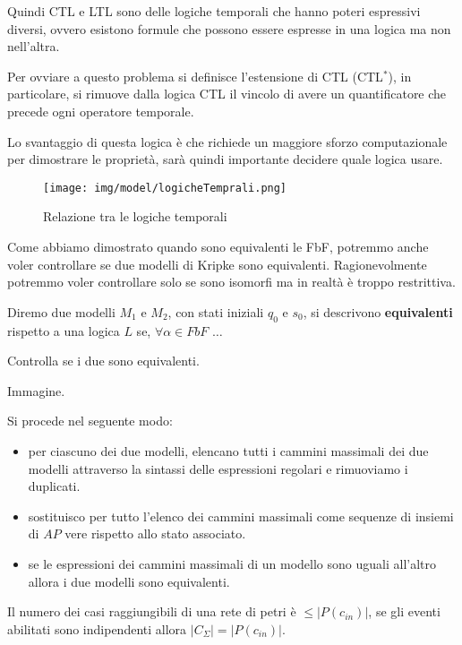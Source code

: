 Quindi CTL e LTL sono delle logiche temporali che hanno poteri espressivi diversi,
ovvero esistono formule che possono essere espresse in una logica ma non nell'altra.

Per ovviare a questo problema si definisce l'estensione di CTL (CTL$^\ast$),
in particolare, si rimuove dalla logica CTL il vincolo di avere un quantificatore
che precede ogni operatore temporale.

Lo svantaggio di questa logica è che richiede un maggiore sforzo computazionale
per dimostrare le proprietà, sarà quindi importante decidere quale logica usare.
\begin{figure}[!ht]
    \centering
    \texttt{[image: img/model/logicheTemprali.png]}
    \caption{Relazione tra le logiche temporali}
\end{figure}

Come abbiamo dimostrato quando sono equivalenti le FbF, potremmo anche voler
controllare se due modelli di Kripke sono equivalenti. Ragionevolmente potremmo
voler controllare solo se sono isomorfi ma in realtà è troppo restrittiva. 

\begin{definizione}
    Diremo due modelli $M_1$ e $M_2$, con stati iniziali $q_0$ e $s_0$, si descrivono
    \textbf{equivalenti} rispetto a una logica $L$ se, $\forall \alpha \in FbF$
    $\dots$ 
\end{definizione}

\begin{esempio}
    Controlla se i due sono equivalenti.
    
    Immagine.

    Si procede nel seguente modo:
    \begin{itemize}
        \item per ciascuno dei due modelli, elencano tutti i cammini massimali dei 
        due modelli attraverso la sintassi delle espressioni regolari e rimuoviamo
        i duplicati.
        \item sostituisco per tutto l'elenco dei cammini massimali come sequenze
        di insiemi di $AP$ vere rispetto allo stato associato. 
        \item se le espressioni dei cammini massimali di un modello sono uguali 
        all'altro allora i due modelli sono equivalenti.
    \end{itemize}
\end{esempio}
\begin{nota}
    Il numero dei casi raggiungibili di una rete di petri è $\le |P(c_{in})|$, se
    gli eventi abilitati sono indipendenti allora $|C_\Sigma| = |P(c_{in})|$.
\end{nota}

